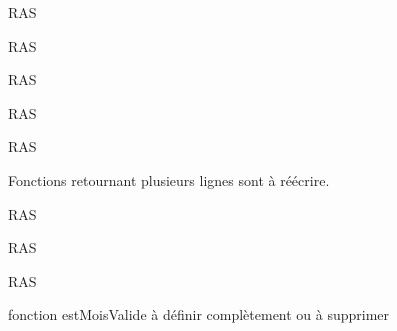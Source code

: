 
\begin{DoxyRefList}
\item[\label{todo__todo000001}%
\hypertarget{todo__todo000001}{}%
Espace de nommage \hyperlink{namespacedefault}{default} ]R\-A\-S 

R\-A\-S 

R\-A\-S 

R\-A\-S 

R\-A\-S 

Fonctions retournant plusieurs lignes sont à réécrire. 

R\-A\-S 

R\-A\-S 

R\-A\-S 

fonction est\-Mois\-Valide à définir complètement ou à supprimer 
\end{DoxyRefList}